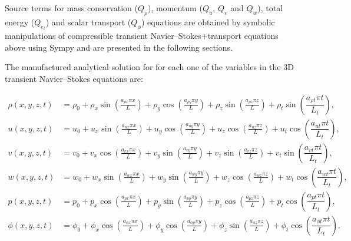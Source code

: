 \documentclass[10pt]{article}
\begin{document}
Source terms  for mass conservation ($Q_\rho$), momentum ($Q_u$, $Q_v$ and $Q_w$), total energy ($Q_{e_t}$) and scalar transport ($Q_\phi$) equations are obtained by symbolic manipulations of compressible transient Navier--Stokes+transport equations above using Sympy and are presented in the following sections.




The manufactured analytical solution for for each one of the variables in the 3D transient Navier--Stokes equations are:

\begin{equation}
\begin{split}
\label{eq:manufactured_3d} 
\rho\left( x ,y ,z,t\right) &=  \rho_{0}+ \rho_{x} \sin\left(\frac{a_{ \rho  x} \pi x}{L}\right)+ \rho_{y} \cos\left(\frac{a_{ \rho  y} \pi y}{L}\right) + \rho_{z} \sin\left(\frac{a_{ \rho  z} \pi z}{L}\right) + \rho_t \sin\left(\dfrac{a_{\rho t} \pi t}{L_t}\right),\\
u\left( x ,y ,z,t\right) &= u_{0}+u_{x} \sin\left(\frac{a_{u  x} \pi x}{L}\right)+u_{y} \cos\left(\frac{a_{u  y} \pi y}{L}\right)+u_{z} \cos\left(\frac{a_{u  z} \pi z}{L}\right) + u_t \cos\left(\dfrac{a_{u t} \pi t}{L_t}\right),\\
v\left( x ,y ,z,t\right) &= v_{0}+v_{x} \cos\left(\frac{a_{v  x} \pi x}{L}\right)+v_{y} \sin\left(\frac{a_{v  y} \pi y}{L}\right)+v_{z} \sin\left(\frac{a_{v  z} \pi z}{L}\right)+ v_t \sin\left(\dfrac{a_{v t} \pi t}{L_t}\right), \\
w\left( x ,y ,z,t\right) &= w_{0}+w_{x} \sin\left(\frac{a_{w  x} \pi x}{L}\right)+w_{y} \sin\left(\frac{a_{w  y} \pi y}{L}\right)+ w_{z} \cos\left(\frac{a_{w  z} \pi z}{L}\right)+ w_t \cos\left(\dfrac{a_{w t} \pi t}{L_t}\right) ,\\
p\left( x ,y ,z,t\right) &= p_{0}+p_{x} \cos\left(\frac{a_{p  x} \pi x}{L}\right)+p_{y} \sin\left(\frac{a_{p  y} \pi y}{L}\right)+ p_{z} \cos\left(\frac{a_{p  z} \pi z}{L}\right)+ p_t \cos\left(\dfrac{a_{p t} \pi t}{L_t}\right),\\
\phi\left( x ,y ,z,t\right) &= \phi_{0}+\phi_{x} \cos\left(\frac{a_{\phi  x} \pi x}{L}\right)+\phi_{y} \cos\left(\frac{a_{\phi  y} \pi y}{L}\right)+ \phi_{z} \sin\left(\frac{a_{\phi  z} \pi z}{L}\right)+ \phi_t \cos\left(\dfrac{a_{\phi t} \pi t}{L_t}\right).\\
\end{split}
\end{equation}
\end{document}
